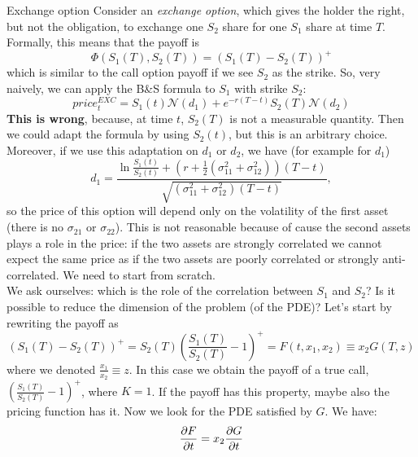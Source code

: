 \begin{example}{Exchange option}{}{}
    Consider an \emph{exchange option}, which gives the holder the right, but not the obligation, to exchange one $S_2$ share for one $S_1$ share at time $T$. Formally, this means that the payoff is
    \begin{equation}
        \Phi(S_1(T),S_2(T)) = (S_1(T)-S_2(T))^+
    \end{equation}
    which is similar to the call option payoff if we see $S_2$ as the strike. So, very naively, we can apply the B\&S formula to $S_1$ with strike $S_2$:
    \begin{equation}
        price_t^{EXC} = S_1(t)\mathcal{N}(d_1) + e^{-r(T-t)}S_2(T)\mathcal{N}(d_2)
    \end{equation}
    \textbf{This is wrong}, because, at time $t$, $S_2(T)$ is not a measurable quantity. Then we could adapt the formula by using $S_2(t)$, but this is an arbitrary choice. Moreover, if we use this adaptation on $d_1$ or $d_2$, we have (for example for $d_1$)
    \begin{equation}
        d_1 = \dfrac{\ln\frac{S_1(t)}{S_2(t)}+\left(r+\frac{1}{2}(\sigma_{11}^2 + \sigma_{12}^2)\right)(T-t)}{\sqrt{(\sigma_{11}^2 + \sigma_{12}^2)(T-t)}},
    \end{equation}
    so the price of this option will depend only on the volatility of the first asset (there is no $\sigma_{21}$ or $\sigma_{22}$). This is not reasonable because of cause the second assets plays a role in the price: if the two assets are strongly correlated we cannot expect the same price as if the two assets are poorly correlated or strongly anti-correlated. We need to start from scratch.\\
    We ask ourselves: which is the role of the correlation between $S_1$ and $S_2$? Is it possible to reduce the dimension of the problem (of the PDE)? Let's start by rewriting the payoff as 
    \begin{equation}
        (S_1(T)-S_2(T))^+ = S_2(T)\left(\dfrac{S_1(T)}{S_2(T)}-1\right)^+ = F(t,x_1,x_2) \equiv x_2 G(T,z)
    \end{equation}
    where we denoted $\frac{x_1}{x_2}\equiv z$. In this case we obtain the payoff of a true call, $\left(\frac{S_1(T)}{S_2(T)}-1\right)^+$, where $K=1$. If the payoff has this property, maybe also the pricing function has it. Now we look for the PDE satisfied by $G$. We have:
    \begin{align*}
        \pdv{F}{t} &= x_2\pdv{G}{t} \\

\end{align*}
\end{example}
